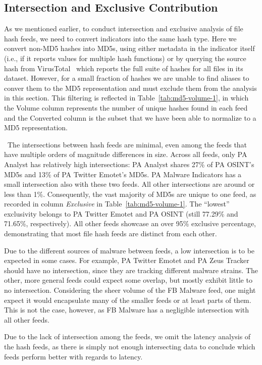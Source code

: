 \subsection{Intersection and Exclusive Contribution}
\label{sec:hash-overlap}

As we mentioned earlier, to conduct intersection and exclusive
analysis of file hash feeds, we need to convert indicators into the
same hash type. Here we convert non-MD5 hashes into MD5s, using either
metadata in the indicator itself (i.e., if it reports values for
multiple hash functions) or by querying the source hash from
VirusTotal~\cite{VirusTotal} which reports the full suite of hashes
for all files in its dataset.  However, for a small fraction of hashes
we are unable to find aliases to conver them to the MD5 representation
and must exclude them from the analysis in this section.  This filtering is
reflected in Table~\ref{tab:md5-volume-1}, in which the Volume column
represents the number of unique hashes found in each feed and the Converted
column is the subset that we have been able to normalize to a MD5
representation.

\finding\ The intersections between hash feeds are minimal,
even among the feeds that have multiple orders of magnitude differences in size.
Across all feeds, only PA Analyst has relatively high intersections: PA Analyst
shares 27\% of PA OSINT's MD5s and 13\% of PA Twitter Emotet's MD5s. PA Malware
Indicators has a small intersection also with these two feeds. All other
intersections are around or less than 1\%. Consequently, the vast majority of
MD5s are unique to one feed, as recorded in column \textit{Exclusive} in
Table~\ref{tab:md5-volume-1}. The ``lowest'' exclusivity belongs to PA Twitter
Emotet and PA OSINT (still 77.29\% and 71.65\%, respectively). All other feeds
showcase an over 95\% exclusive percentage, demonstrating that most file hash feeds
are distinct from each other.

Due to the different sources of malware between feeds, a low intersection is to
be expected in some cases. For example, PA Twitter Emotet and PA Zeus Tracker
should have no intersection, since they are tracking different malware strains.
The other, more general feeds could expect some overlap, but mostly exhibit
little to no intersection. Considering the sheer volume of the FB Malware feed,
one might expect it would encapsulate many of the smaller feeds or at least
parts of them. This is not the case, however, as FB Malware has a negligible
intersection with all other feeds.

Due to the lack of intersection among the feeds, we omit the latency analysis
of the hash feeds, as there is simply not enough intersecting data to conclude
which feeds perform better with regards to latency.
